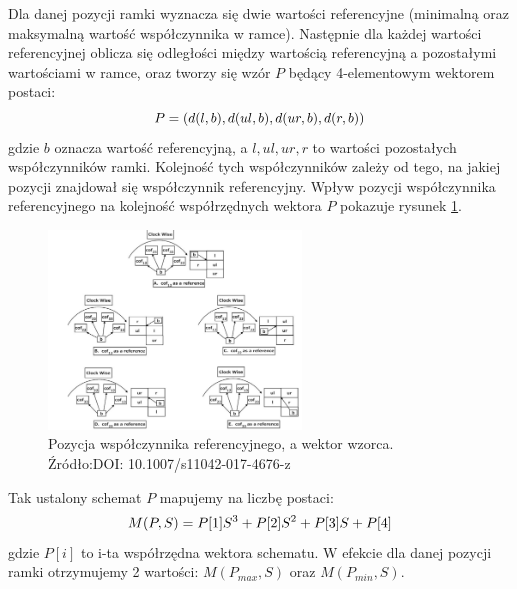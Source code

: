 Dla danej pozycji ramki wyznacza się dwie wartości referencyjne (minimalną oraz maksymalną wartość współczynnika w ramce). Następnie dla każdej wartości referencyjnej oblicza się odległości między wartością referencyjną a pozostałymi wartościami w ramce, oraz tworzy się wzór $P$ będący 4-elementowym wektorem postaci:
\begin{equation}
	P = (d(l, b),\space d(ul,b), \space d(ur, b), \space d(r, b))
\end{equation}
gdzie $b$ oznacza wartość referencyjną, a $l, ul, ur, r$ to wartości pozostałych współczynników ramki. Kolejność tych współczynników zależy od tego, na jakiej pozycji znajdował się współczynnik referencyjny. Wpływ pozycji współczynnika referencyjnego na kolejność współrzędnych wektora $P$ pokazuje rysunek \ref{fig:coeff_order}.
\begin{figure}[ht!]
	\centering
	\includegraphics[width=0.6\textwidth]{./img/dct_match_coeff_order.png}
	\caption{\label{fig:coeff_order} Pozycja współczynnika referencyjnego, a wektor wzorca. Źródło:DOI: 10.1007/s11042-017-4676-z}
\end{figure}

Tak ustalony schemat $P$ mapujemy na liczbę postaci:
\begin{equation}
	M(P,S) = P[1]S^3\space + \space P[2]S^2\space + \space P[3]S\space + \space P[4]
\end{equation}
gdzie $P[i]$ to i-ta współrzędna wektora schematu. W efekcie dla danej pozycji ramki otrzymujemy 2 wartości: $M(P_{max}, S)$ oraz $M(P_{min}, S)$.\\

